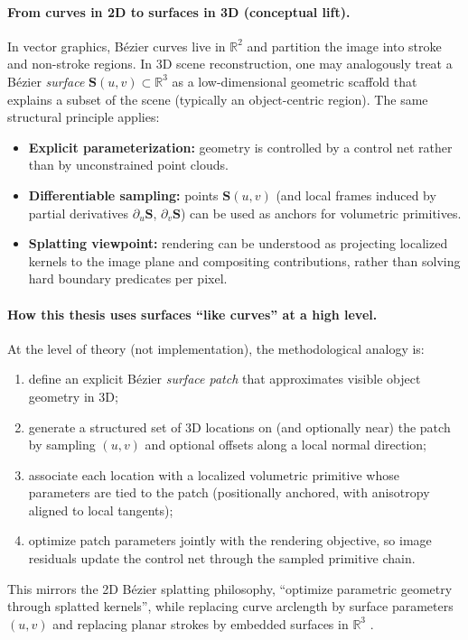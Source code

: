 \documentclass{report}
\begin{document}
\paragraph{From curves in 2D to surfaces in 3D (conceptual lift).}
In vector graphics, B\'ezier curves live in $\mathbb{R}^2$ and partition the image into stroke and non-stroke regions. In 3D scene reconstruction, one may analogously treat a B\'ezier \emph{surface} $\mathbf{S}(u,v)\subset\mathbb{R}^3$ as a low-dimensional geometric scaffold that explains a subset of the scene (typically an object-centric region). The same structural principle applies:
\begin{itemize}
    \item \textbf{Explicit parameterization:} geometry is controlled by a control net rather than by unconstrained point clouds.
    \item \textbf{Differentiable sampling:} points $\mathbf{S}(u,v)$ (and local frames induced by partial derivatives $\partial_u \mathbf{S}$, $\partial_v \mathbf{S}$) can be used as anchors for volumetric primitives.
    \item \textbf{Splatting viewpoint:} rendering can be understood as projecting localized kernels to the image plane and compositing contributions, rather than solving hard boundary predicates per pixel.
\end{itemize}

\paragraph{How this thesis uses surfaces ``like curves'' at a high level.}
At the level of theory (not implementation), the methodological analogy is:
\begin{enumerate}
    \item define an explicit B\'ezier \emph{surface patch} that approximates visible object geometry in 3D;
    \item generate a structured set of 3D locations on (and optionally near) the patch by sampling $(u,v)$ and optional offsets along a local normal direction;
    \item associate each location with a localized volumetric primitive whose parameters are tied to the patch (positionally anchored, with anisotropy aligned to local tangents);
    \item optimize patch parameters jointly with the rendering objective, so image residuals update the control net through the sampled primitive chain.
\end{enumerate}
This mirrors the 2D B\'ezier splatting philosophy, ``optimize parametric geometry through splatted kernels'', while replacing curve arclength by surface parameters $(u,v)$ and replacing planar strokes by embedded surfaces in $\mathbb{R}^3$ \cite{liu2025bezier}.
\end{document}

